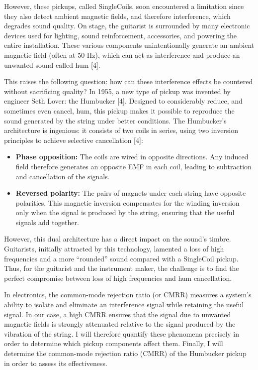\documentclass[11pt, a4paper]{article}
\begin{document}
However, these pickups, called SingleCoils, soon encountered a limitation since they also detect ambient magnetic fields, and therefore interference, which degrades sound quality. On stage, the guitarist is surrounded by many electronic devices used for lighting, sound reinforcement, accessories, and powering the entire installation. These various components unintentionally generate an ambient magnetic field (often at 50 Hz), which can act as interference and produce an unwanted sound called hum [4].

This raises the following question: how can these interference effects be countered without sacrificing quality? In 1955, a new type of pickup was invented by engineer Seth Lover: the Humbucker [4]. Designed to considerably reduce, and sometimes even cancel, hum, this pickup makes it possible to reproduce the sound generated by the string under better conditions. The Humbucker's architecture is ingenious: it consists of two coils in series, using two inversion principles to achieve selective cancellation [4]:
\begin{itemize}
    \item \textbf{Phase opposition:} The coils are wired in opposite directions. Any induced field therefore generates an opposite EMF in each coil, leading to subtraction and cancellation of the signals.
    \item \textbf{Reversed polarity:} The pairs of magnets under each string have opposite polarities. This magnetic inversion compensates for the winding inversion only when the signal is produced by the string, ensuring that the useful signals add together.
\end{itemize}

However, this dual architecture has a direct impact on the sound's timbre. Guitarists, initially attracted by this technology, lamented a loss of high frequencies and a more ``rounded'' sound compared with a SingleCoil pickup. Thus, for the guitarist and the instrument maker, the challenge is to find the perfect compromise between loss of high frequencies and hum cancellation.

In electronics, the common-mode rejection ratio (or CMRR) measures a system's ability to isolate and eliminate an interference signal while retaining the useful signal. In our case, a high CMRR ensures that the signal due to unwanted magnetic fields is strongly attenuated relative to the signal produced by the vibration of the string. I will therefore quantify these phenomena precisely in order to determine which pickup components affect them. Finally, I will determine the common-mode rejection ratio (CMRR) of the Humbucker pickup in order to assess its effectiveness.
\end{document}
